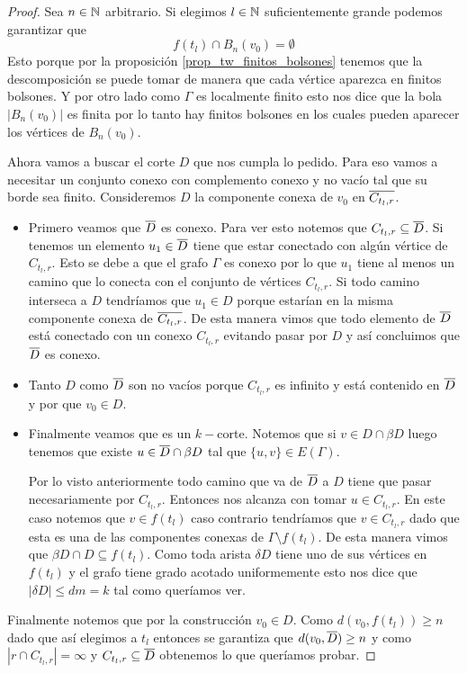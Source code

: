 \documentclass[tesis.tex]{subfiles}
\begin{document}
\begin{proof}
	Sea $n \in \mathbb{N}$ arbitrario. 
	Si elegimos $l \in \mathbb{N}$ suficientemente grande podemos garantizar que
	\[
	f({t_l}) \cap B_n(v_0) = \emptyset
	\]
	Esto porque por la proposición \ref{prop_tw_finitos_bolsones} tenemos que la descomposición se puede tomar de manera que cada vértice aparezca en finitos bolsones.
	Y por otro lado como $\Gamma$ es localmente finito esto nos dice que la bola $|B_n(v_0)|$ es finita por lo tanto hay finitos bolsones en los cuales pueden aparecer los vértices de $B_{n}(v_{0})$.
	
	
	Ahora vamos a buscar el corte $D$ que nos cumpla lo pedido.
	Para eso vamos a necesitar un conjunto conexo con complemento conexo y no vacío tal que su borde sea finito.
	Consideremos $D$ la componente conexa de $v_0$ en $\overline{ C_{t_l, r}}$.
	
	\begin{itemize}
		\item 	
		Primero veamos que $\overline D$ es conexo.
		Para ver esto notemos que $C_{t_{l},r} \subseteq \overline D$. 
		Si tenemos un elemento $u_1 \in \overline D$ tiene que estar conectado con algún vértice de $C_{t_l, r}$.
		Esto se debe a que el grafo $\Gamma$ es conexo por lo que $u_{1}$ tiene al menos un camino que lo conecta con el conjunto de vértices $C_{t_{l},r}$.
		Si todo camino interseca a $D$ tendríamos que $u_{1} \in D$ porque estarían en la misma componente conexa de $\overline{ C_{t_l, r}}$.
		De esta manera vimos que todo elemento de $\overline D$ está conectado con un conexo $C_{t_l, r}$ evitando pasar por $D$ y así concluimos que $\overline D$ es conexo.
		\item 
		Tanto $D$ como $\overline D$ son no vacíos porque $C_{t_l, r}$ es infinito y está contenido en $\overline D$ y por que $v_0 \in D$.
		\item
		Finalmente veamos que es un $k-$corte.
		Notemos que si $v \in D \cap \beta D$ luego tenemos que existe $u \in \overline D \cap \beta D$ tal que $\{u,v\} \in E(\Gamma)$.
		
		Por lo visto anteriormente todo camino que va de $\overline D$ a $D$ tiene que pasar necesariamente por $C_{t_l, r}$. 
		Entonces nos alcanza con tomar $u \in C_{t_l, r}$.
		En este caso notemos que $v \in f{(t_l)}$ caso contrario tendríamos que $v \in C_{t_l, r}$ dado que esta es una de las componentes conexas de $\Gamma \setminus f{(t_l)}$.
		De esta manera vimos que $\beta D \cap D \subseteq f{(t_l)}$.
		Como toda arista $\delta D$ tiene uno de sus vértices en $f(t_{l})$ y el grafo tiene grado acotado uniformemente esto nos dice que $|\delta D| \le dm = k$ tal como queríamos ver. 
		
	\end{itemize}
	
Finalmente notemos que por la construcción $v_{0} \in D$.
Como $d(v_{0}, f(t_{l})) \ge n$ dado que así elegimos a $t_{l}$ entonces se garantiza que $d(v_{0}, \overline D) \ge n$ y como $|r \cap C_{t_{l},r}| = \infty$ y $C_{t_{l},r} \subseteq \overline D$ obtenemos lo que queríamos probar.
	
\end{proof}
\end{document}
